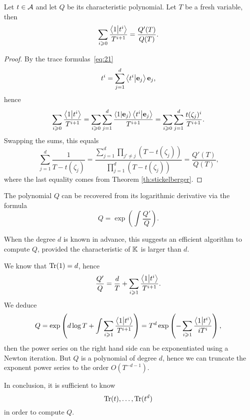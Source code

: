 \begin{lemma}
  \label{th:multi-newton-sums}
  Let $t\in\mathcal{A}$ and let $Q$ be its characteristic
  polynomial. Let $T$ be a fresh variable, then
  \begin{equation}
    \label{eq:25}
    \sum_{i\geqslant0} \frac{\left\langle 1 \middle| t^{i} \right\rangle}{T^{i+1}} = \frac{Q'(T)}{Q(T)}
    \text{.}
  \end{equation}
\end{lemma}
\begin{proof}
  By the trace formulas~\eqref{eq:21}
  \begin{equation}
    \label{eq:26}
    t^i = \sum_{j=1}^d\left\langle t^i \middle| \mathbf{e}_j \right\rangle\mathbf{e}_j
    \text{,}
  \end{equation}
  hence
  \begin{equation}
    \label{eq:27}
    \sum_{i\geqslant0}\frac{\left\langle 1 \middle| t^i \right\rangle}{T^{i+1}} =
    \sum_{i\geqslant0}\sum_{j=1}^d\frac{\left\langle 1 \middle| \mathbf{e}_j \right\rangle\left\langle t^i \middle| \mathbf{e}_j \right\rangle}{T^{i+1}} =
    \sum_{i\geqslant0}\sum_{j=1}^d\frac{t(\zeta_j)^i}{T^{i+1}}
    \text{.}
  \end{equation}
  Swapping the sums, this equals
  \begin{equation}
    \label{eq:28}
    \sum_{j=1}^d\frac{1}{T-t(\zeta_j)} =
    \frac{\sum_{j=1}^d\prod_{j'\ne j}(T-t(\zeta_j))}{\prod_{j=1}^d(T-t(\zeta_j))} =
    \frac{Q'(T)}{Q(T)}
    \text{,}
  \end{equation}
  where the last equality comes from Theorem \ref{th:stickelberger}.
\end{proof}

\begin{remark}
  \label{rk:newton-sums}
  The polynomial $Q$ can be recovered from its logarithmic derivative
  via the formula
  \begin{equation}
    \label{eq:30}
    Q = \exp\left(\int \frac{Q'}{Q}\right)
    \text{.}
  \end{equation}
  

  When the degree $d$ is known in advance, this suggests an efficient
  algorithm to compute $Q$, provided the characteristic of $\mathbb{K}$ is
  larger than $d$. 

  We know that $\operatorname{Tr}(1)=d$, hence 
  \begin{equation}
    \label{eq:32}
    \frac{Q'}{Q} =
    \frac{d}{T} + \sum_{i\geqslant 1}\frac{\left\langle 1 \middle| t^i \right\rangle}{T^{i+1}} 
    \text{.}
  \end{equation}
  We deduce
  \begin{equation}
    \label{eq:33}
    Q = \exp\left(d\log T + \int\sum_{i\geqslant1}\frac{\left\langle 1 \middle| t^i \right\rangle}{T^{i+1}}\right) =
    T^d\exp\left(-\sum_{i\geqslant 1}\frac{\left\langle 1 \middle| t^i \right\rangle}{iT^i}\right)
    \text{,}
  \end{equation}
  then the power series on the right hand side can be exponentiated
  using a Newton iteration.  But $Q$ is a polynomial of degree $d$,
  hence we can truncate the exponent power series to the order
  $O(T^{-d-1})$.

  In conclusion, it is sufficient to know
  \begin{equation}
    \label{eq:34}
    \operatorname{Tr}(t),\ldots,\operatorname{Tr}(t^d)
  \end{equation}
  in order to compute $Q$.
\end{remark}

